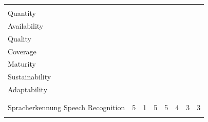 \documentclass[]{../../metanetpaper}
\begin{document}
\begin{Parallel}[c]{79mm}{78mm}
\begin{figure}
\centering
\begin{tabular}{>{\columncolor{orange1}}p{.33\linewidth}@{\hspace*{6mm}}c@{\hspace*{6mm}}c@{\hspace*{6mm}}c@{\hspace*{6mm}}c@{\hspace*{6mm}}c@{\hspace*{6mm}}c@{\hspace*{6mm}}c}
\rowcolor{orange1}
 \cellcolor{white}&\begin{sideways}\makecell[l]{Quantität \\ Quantity}\end{sideways}
&\begin{sideways}\makecell[l]{\makecell[l]{Verfügbarkeit \\ Availability} }\end{sideways} &\begin{sideways}\makecell[l]{Qualität \\ Quality}\end{sideways}
&\begin{sideways}\makecell[l]{Abdeckung \\ Coverage}\end{sideways} &\begin{sideways}\makecell[l]{Ausgereiftheit \\ Maturity}\end{sideways} &\begin{sideways}\makecell[l]{Nachhaltigkeit \\ Sustainability}\end{sideways} &\begin{sideways}\makecell[l]{Adaptierbarkeit \\ Adaptability}\end{sideways} \\ \addlinespace
\multicolumn{8}{>{\columncolor{orange2}}l}{Sprachtechnologie: Werkzeuge, Technologien und Anwendungen} \\\addlinespace[{-.009cm}]
\multicolumn{8}{>{\columncolor{orange2}}l}{Language Technology: Tools, Technologies and Applications} \\ \addlinespace
Spracherkennung \newline Speech Recognition	&5&1&5&5&4&3&3 \\ \addlinespace

\end{tabular}
\end{figure}
\end{Parallel}
\end{document}
